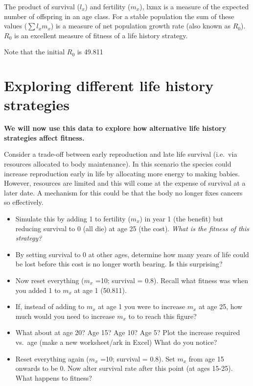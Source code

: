 \documentclass[
  a4paper]{book}
\begin{document}
The product of survival (\(l_x\)) and fertility (\(m_x\)), lxmx is a
measure of the expected number of offspring in an age class. For a
stable population the sum of these values (\(\sum l_x m_x\)) is a
measure of net population growth rate (also known as \(R_0\)). \(R_0\)
is an excellent measure of fitness of a life history strategy.

Note that the initial \(R_0\) is 49.811

\hypertarget{exploring-different-life-history-strategies}{%
\section{Exploring different life history
strategies}\label{exploring-different-life-history-strategies}}

\textbf{We will now use this data to explore how alternative life
history strategies affect fitness.}

Consider a trade-off between early reproduction and late life survival
(i.e.~via resources allocated to body maintenance). In this scenario the
species could increase reproduction early in life by allocating more
energy to making babies. However, resources are limited and this will
come at the expense of survival at a later date. A mechanism for this
could be that the body no longer fixes cancers so effectively.

\begin{itemize}
\item
  Simulate this by adding 1 to fertility (\(m_x\)) in year 1 (the
  benefit) but reducing survival to 0 (all die) at age 25 (the cost).
  \emph{What is the fitness of this strategy?}
\item
  By setting survival to 0 at other ages, determine how many years of
  life could be lost before this cost is no longer worth bearing. Is
  this surprising?
\item
  Now reset everything (\(m_x\) =10; survival = 0.8). Recall what
  fitness was when you added 1 to \(m_x\) at age 1 (50.811).
\item
  If, instead of adding to \(m_x\) at age 1 you were to increase \(m_x\)
  at age 25, how much would you need to increase \(m_x\) to to reach
  this figure?
\item
  What about at age 20? Age 15? Age 10? Age 5? Plot the increase
  required vs.~age (make a new worksheet/ark in Excel) What do you
  notice?
\item
  Reset everything again (\(m_x\) =10; survival = 0.8). Set \(m_x\) from
  age 15 onwards to be 0. Now alter survival rate after this point (at
  ages 15-25). What happens to fitness?
\end{itemize}
\end{document}
